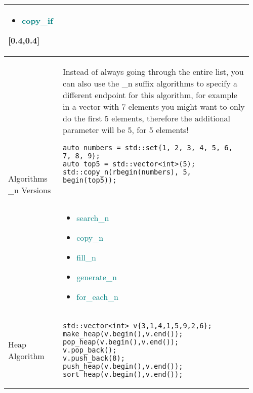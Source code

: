 \documentclass[main.tex,fontsize=8pt,paper=a4,paper=portrait,DIV=calc]{scrartcl}
\begin{document}
\begin{table}[ht!]
\begin{tabular}{|m{0.2\linewidth}|m{0.755\linewidth}|}
{\begin{itemize}
\item \textcolor{teal}{copy\_if}
\end{itemize} 
}[0.4,0.4]\\
\hline
Algorithms \_n Versions & 
Instead of always going through the entire list, you can also use the \_n suffix algorithms to specify a different endpoint for this algorithm, for example in a vector with 7 elements you might want to only do the first 5 elements, therefore the additional parameter will be 5, for 5 elements!\newline
\begin{lstlisting}
auto numbers = std::set{1, 2, 3, 4, 5, 6, 7, 8, 9};
auto top5 = std::vector<int>(5);
std::copy_n(rbegin(numbers), 5, begin(top5));
\end{lstlisting}
\, \newline
\begin{itemize}
\item \textcolor{teal}{search\_n}
\item \textcolor{teal}{copy\_n}
\item \textcolor{teal}{fill\_n}
\item \textcolor{teal}{generate\_n}
\item \textcolor{teal}{for\_each\_n}
\vspace{-3mm}
\end{itemize}\\ 
\hline
Heap Algorithm & 
\begin{lstlisting}
std::vector<int> v{3,1,4,1,5,9,2,6};
make_heap(v.begin(),v.end());
pop_heap(v.begin(),v.end());
v.pop_back();
v.push_back(8);
push_heap(v.begin(),v.end());
sort_heap(v.begin(),v.end());
\end{lstlisting}\\
\hline
\end{tabular}
\end{table}
\pagebreak
\end{document}
